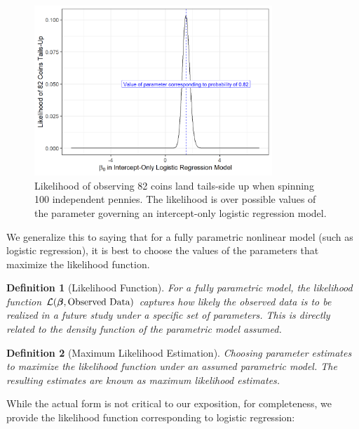\documentclass[
]{book}
\theoremstyle{plain}
\theoremstyle{mydefn}
\newtheorem{definition}{Definition}[chapter]
\theoremstyle{myexmpl}
\theoremstyle{remark}
\begin{document}
\begin{figure}

{\centering \includegraphics[width=0.8\textwidth]{./Images/nlm-coins-likelihood-1} 

}

\caption{Likelihood of observing 82 coins land tails-side up when spinning 100 independent pennies. The likelihood is over possible values of the parameter governing an intercept-only logistic regression model.}\label{fig:nlm-coins-likelihood}
\end{figure}

We generalize this to saying that for a fully parametric nonlinear model (such as logistic regression), it is best to choose the values of the parameters that maximize the likelihood function.

\begin{definition}[Likelihood Function]
\protect\hypertarget{def:defn-likelihood}{}{\label{def:defn-likelihood} {} }For a fully parametric model, the likelihood function \(\mathcal{L}(\boldsymbol{\beta}, \text{Observed Data})\) captures how likely the observed data is to be realized in a future study under a specific set of parameters. This is directly related to the density function of the parametric model assumed.
\end{definition}

\begin{definition}[Maximum Likelihood Estimation]
\protect\hypertarget{def:defn-mle}{}{\label{def:defn-mle} {} }Choosing parameter estimates to maximize the likelihood function under an assumed parametric model. The resulting estimates are known as maximum likelihood estimates.
\end{definition}

While the actual form is not critical to our exposition, for completeness, we provide the likelihood function corresponding to logistic regression:
\end{document}
